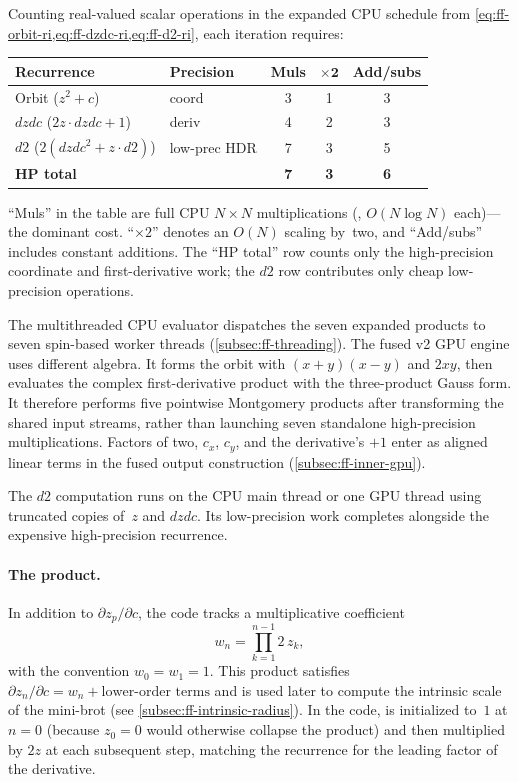 Counting real-valued scalar operations in the expanded CPU schedule from
\cref{eq:ff-orbit-ri,eq:ff-dzdc-ri,eq:ff-d2-ri}, each iteration requires:

\begin{center}
\small
\begin{tabular}{llccc}
\hline
\textbf{Recurrence} & \textbf{Precision} &
  \textbf{Muls} & $\boldsymbol{\times 2}$ & \textbf{Add/subs} \\
\hline
Orbit ($z^2 + c$) & coord &
  3 & 1 & 3 \\
$\mathit{dzdc}$ ($2z \cdot \mathit{dzdc} + 1$) & deriv &
  4 & 2 & 3 \\
$d2$ ($2(\mathit{dzdc}^2 {+} z {\cdot} d2)$) & low-prec HDR &
  7 & 3 & 5 \\
\hline
\textbf{HP total} & &
  \textbf{7} & \textbf{3} & \textbf{6} \\
\hline
\end{tabular}
\end{center}

\noindent
``Muls'' in the table are full CPU $N \times N$ multiplications
(, $O(N \log N)$ each)---the dominant cost.
``$\times 2$'' denotes an $O(N)$ scaling by~two, and ``Add/subs'' includes
constant additions.  The ``HP total'' row counts only the high-precision
coordinate and first-derivative work; the $d2$ row contributes only cheap
low-precision operations.

The multithreaded CPU evaluator dispatches the seven expanded products to
seven spin-based worker threads (\cref{subsec:ff-threading}).  The fused v2 GPU
engine uses different algebra.  It forms the orbit with
$(x+y)(x-y)$ and $2xy$, then evaluates the complex first-derivative product
with the three-product Gauss form.  It therefore performs five pointwise
Montgomery products after transforming the shared input streams, rather than
launching seven standalone high-precision multiplications.  Factors of two,
$c_x$, $c_y$, and the derivative's $+1$ enter as aligned linear terms in the
fused output construction (\cref{subsec:ff-inner-gpu}).

The $d2$ computation runs on the CPU main thread or one GPU thread using
truncated copies of~$z$ and $\mathit{dzdc}$.  Its low-precision work completes
alongside the expensive high-precision recurrence.

\paragraph{The  product.}
In addition to $\partial z_p/\partial c$, the code tracks a multiplicative
coefficient
\begin{equation}\label{eq:ff-zcoeff}
w_n = \prod_{k=1}^{n-1} 2\,z_k,
\end{equation}
with the convention $w_0 = w_1 = 1$.  This product satisfies
$\partial z_n/\partial c = w_n + \text{lower-order terms}$ and is used later
to compute the intrinsic scale of the mini-brot (see
\cref{subsec:ff-intrinsic-radius}).  In the code,  is
initialized to~$1$ at $n=0$ (because $z_0 = 0$ would otherwise collapse the
product) and then multiplied by $2z$ at each subsequent step, matching the
recurrence for the leading factor of the derivative.

